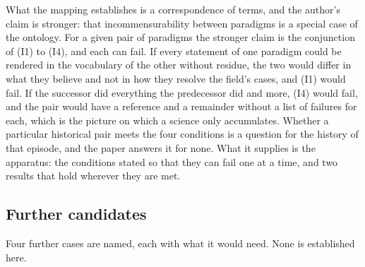 What the mapping establishes is a correspondence of terms, and the author's claim is stronger: that incommensurability between paradigms is a special case of the ontology. For a given pair of paradigms the stronger claim is the conjunction of (I1) to (I4), and each can fail. If every statement of one paradigm could be rendered in the vocabulary of the other without residue, the two would differ in what they believe and not in how they resolve the field's cases, and (I1) would fail. If the successor did everything the predecessor did and more, (I4) would fail, and the pair would have a reference and a remainder without a list of failures for each, which is the picture on which a science only accumulates. Whether a particular historical pair meets the four conditions is a question for the history of that episode, and the paper answers it for none. What it supplies is the apparatus: the conditions stated so that they can fail one at a time, and two results that hold wherever they are met.

\subsection{Further candidates}
\label{sec:candidates}

Four further cases are named, each with what it would need. None is established here.

